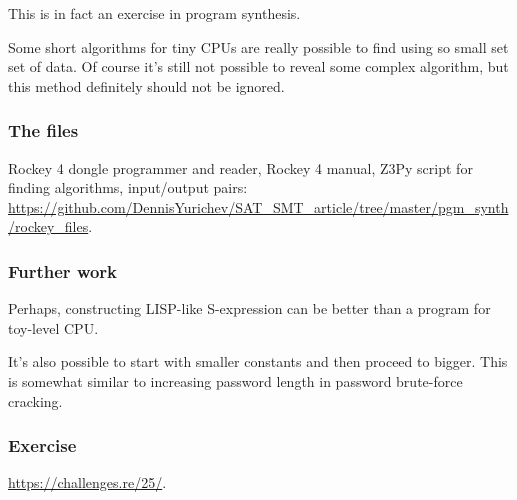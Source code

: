 This is in fact an exercise in program synthesis.

Some short algorithms for tiny \ac{CPU}s are really possible to find using so small set set of data.
Of course it's still not possible to reveal some complex algorithm,
but this method definitely should not be ignored.

\subsubsection{The files}

Rockey 4 dongle programmer and reader, Rockey 4 manual, Z3Py script for finding algorithms, input/output pairs:
\url{https://github.com/DennisYurichev/SAT_SMT_article/tree/master/pgm_synth/rockey_files}.

\subsubsection{Further work}

Perhaps, constructing LISP-like S-expression can be better than a program for toy-level CPU.

It's also possible to start with smaller constants and then proceed to bigger.
This is somewhat similar to increasing password length in password brute-force cracking.

\subsubsection{Exercise}

\url{https://challenges.re/25/}.

